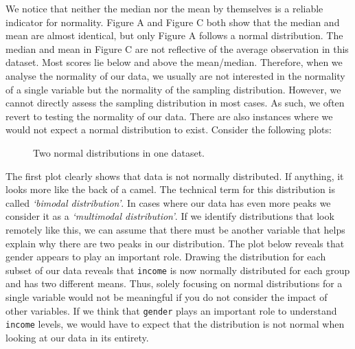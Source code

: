 \documentclass[
  letterpaper,
]{krantz}
\begin{document}
We notice that neither the median nor the mean by themselves is a
reliable indicator for normality. Figure A and Figure C both show that
the median and mean are almost identical, but only Figure A follows a
normal distribution. The median and mean in Figure C are not reflective
of the average observation in this dataset. Most scores lie below and
above the mean/median. Therefore, when we analyse the normality of our
data, we usually are not interested in the normality of a single
variable but the normality of the sampling distribution. However, we
cannot directly assess the sampling distribution in most cases. As such,
we often revert to testing the normality of our data. There are also
instances where we would not expect a normal distribution to exist.
Consider the following plots:

\begin{figure}


\caption{\label{fig-two-normalities-groups}Two normal distributions in
one dataset.}

\end{figure}%

The first plot clearly shows that data is not normally distributed. If
anything, it looks more like the back of a camel. The technical term for
this distribution is called \emph{`bimodal distribution'}. In cases
where our data has even more peaks we consider it as a \emph{`multimodal
distribution'}. If we identify distributions that look remotely like
this, we can assume that there must be another variable that helps
explain why there are two peaks in our distribution. The plot below
reveals that gender appears to play an important role. Drawing the
distribution for each subset of our data reveals that \texttt{income} is
now normally distributed for each group and has two different means.
Thus, solely focusing on normal distributions for a single variable
would not be meaningful if you do not consider the impact of other
variables. If we think that \texttt{gender} plays an important role to
understand \texttt{income} levels, we would have to expect that the
distribution is not normal when looking at our data in its entirety.
\end{document}
